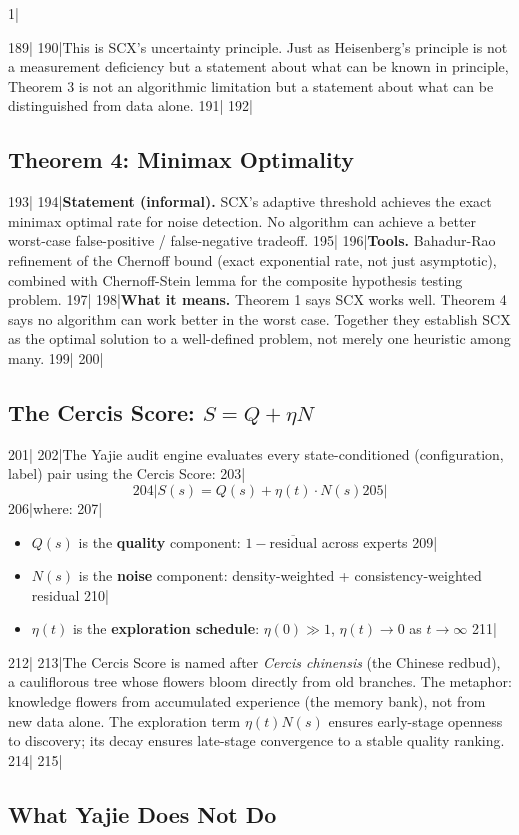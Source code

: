 1|\documentclass[12pt,a4paper]{article}
\begin{document}
189|
190|This is SCX's uncertainty principle. Just as Heisenberg's principle is not a measurement deficiency but a statement about what can be known in principle, Theorem 3 is not an algorithmic limitation but a statement about what can be distinguished from data alone.
191|
192|\subsection{Theorem 4: Minimax Optimality}
193|
194|\textbf{Statement (informal).} SCX's adaptive threshold achieves the exact minimax optimal rate for noise detection. No algorithm can achieve a better worst-case false-positive / false-negative tradeoff.
195|
196|\textbf{Tools.} Bahadur-Rao refinement of the Chernoff bound (exact exponential rate, not just asymptotic), combined with Chernoff-Stein lemma for the composite hypothesis testing problem.
197|
198|\textbf{What it means.} Theorem 1 says SCX works well. Theorem 4 says no algorithm can work better in the worst case. Together they establish SCX as the optimal solution to a well-defined problem, not merely one heuristic among many.
199|
200|\subsection{The Cercis Score: $S = Q + \eta N$}
201|
202|The Yajie audit engine evaluates every state-conditioned (configuration, label) pair using the Cercis Score:
203|\[
204|S(s) = Q(s) + \eta(t) \cdot N(s)
205|\]
206|where:
207|\begin{itemize}
208|\item $Q(s)$ is the \textbf{quality} component: $1 - \overline{\text{residual}}$ across experts
209|\item $N(s)$ is the \textbf{noise} component: density-weighted + consistency-weighted residual
210|\item $\eta(t)$ is the \textbf{exploration schedule}: $\eta(0) \gg 1$, $\eta(t) \to 0$ as $t \to \infty$
211|\end{itemize}
212|
213|The Cercis Score is named after \textit{Cercis chinensis} (the Chinese redbud), a cauliflorous tree whose flowers bloom directly from old branches. The metaphor: knowledge flowers from accumulated experience (the memory bank), not from new data alone. The exploration term $\eta(t) N(s)$ ensures early-stage openness to discovery; its decay ensures late-stage convergence to a stable quality ranking.
214|
215|\subsection{What Yajie Does Not Do}
\end{document}
